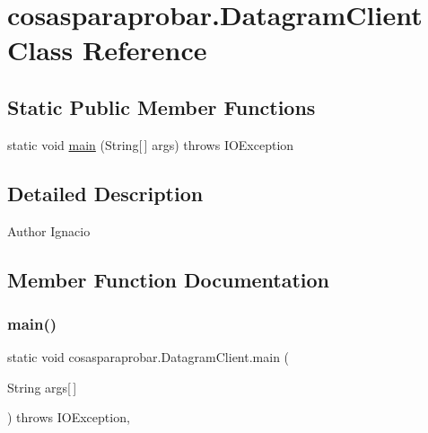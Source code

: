 \hypertarget{classcosasparaprobar_1_1_datagram_client}{}\section{cosasparaprobar.\+Datagram\+Client Class Reference}
\label{classcosasparaprobar_1_1_datagram_client}
\subsection*{Static Public Member Functions}
\begin{DoxyCompactItemize}
\item 
static void \mbox{\hyperlink{classcosasparaprobar_1_1_datagram_client_a6d104162bf341f3c43be5b47401001cb}{main}} (String\mbox{[}$\,$\mbox{]} args)  throws I\+O\+Exception 
\end{DoxyCompactItemize}


\subsection{Detailed Description}
\begin{DoxyAuthor}{Author}
Ignacio 
\end{DoxyAuthor}


\subsection{Member Function Documentation}
\mbox{\label{classcosasparaprobar_1_1_datagram_client_a6d104162bf341f3c43be5b47401001cb}} 
\subsubsection{\texorpdfstring{main()}{main()}}
{\footnotesize\ttfamily static void cosasparaprobar.\+Datagram\+Client.\+main (\begin{DoxyParamCaption}\item[{String}]{args\mbox{[}$\,$\mbox{]} }\end{DoxyParamCaption}) throws I\+O\+Exception\hspace{0.3cm}{\ttfamily [inline]}, {\ttfamily [static]}}



